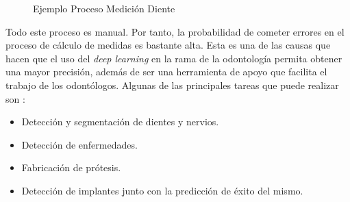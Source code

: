 \begin{figure}[h]
 \centering
  \newline
 \caption{Ejemplo Proceso Medición Diente \cite{lsm2020proceso}}
 \label{f:endo}
\end{figure}

Todo este proceso es manual. Por tanto, la probabilidad de cometer errores en el proceso de cálculo de medidas es bastante alta. Esta es una de las causas que hacen que el uso del \emph{deep learning} en la rama de la odontología permita obtener una mayor precisión, además de ser una herramienta de apoyo que facilita el trabajo de los odontólogos. Algunas de las principales tareas que puede realizar son \cite{kang2020application}:
\begin{itemize}
    \item Detección y segmentación de dientes y nervios.
    \item Detección de enfermedades.
    \item Fabricación de prótesis.
    \item Detección de implantes junto con la predicción de éxito del mismo.
\end{itemize}

